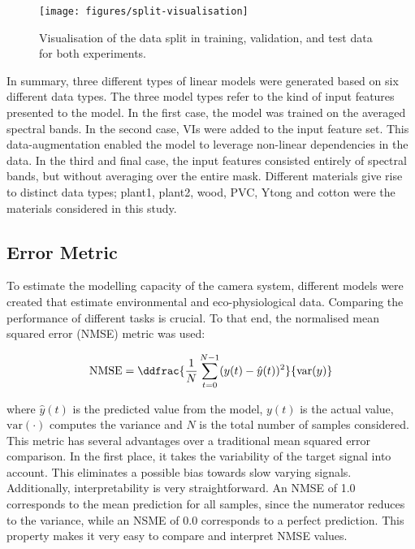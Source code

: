         \begin{figure}[thb]
            \centering
            \texttt{[image: figures/split-visualisation]}            
            \caption{Visualisation of the data split in training, validation, and test data for both experiments.}
            \label{data-split}
        \end{figure}
        
        In summary, three different types of linear models were generated based on six different data types. The three model types refer to the kind of input features presented to the model. In the first case, the model was trained on the averaged spectral bands. In the second case, VIs were added to the input feature set. This data-augmentation enabled the model to leverage non-linear dependencies in the data. In the third and final case, the input features consisted entirely of spectral bands, but without averaging over the entire mask. Different materials give rise to distinct data types; plant1, plant2, wood, PVC, Ytong and cotton were the materials considered in this study.
        
    \subsection{Error Metric}
        
        To estimate the modelling capacity of the camera system, different models were created that estimate environmental and eco-physiological data. Comparing the performance of different tasks is crucial. To that end, the normalised mean squared error (NMSE) metric was used:
        
        \begin{equation}
          \text{NMSE} = \ddfrac{\frac{1}{N}\sum_{t=0}^{N-1} (y(t)-\hat{y}(t))^2}{\text{var}(y)} 
        \end{equation}
        
        where $\hat{y}(t)$ is the predicted value from the model, $y(t)$ is the actual value, $\text{var}(\cdot)$ computes the variance and $N$ is the total number of samples considered. This metric has several advantages over a traditional mean squared error comparison. In the first place, it takes the variability of the target signal into account. This eliminates a possible bias towards slow varying signals. Additionally, interpretability is very straightforward. An NMSE of 1.0 corresponds to the mean prediction for all samples, since the numerator reduces to the variance, while an NSME of 0.0 corresponds to a perfect prediction. This property makes it very easy to compare and interpret NMSE values.
        
